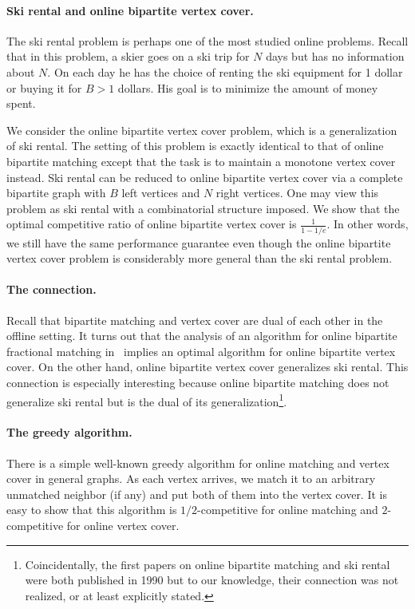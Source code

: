 \documentclass{article}
\begin{document}
\paragraph{Ski rental and online bipartite vertex cover.}
The ski rental problem is perhaps one of the most studied online problems. Recall that in this problem, a skier goes on a ski trip for $N$ days but has no information about $N$. On each day he has the choice of renting the ski equipment for 1 dollar or buying it for $B>1$ dollars. His goal is to minimize the amount of money spent.

We consider the online bipartite vertex cover problem, which is a generalization of ski rental. The setting of this problem is exactly identical to that of online bipartite matching except that the task is to maintain a monotone vertex cover instead. Ski rental can be reduced to online bipartite vertex cover via a complete bipartite graph with $B$ left vertices and $N$ right vertices. One may view this problem as ski rental with a combinatorial structure imposed.
We show that the optimal competitive ratio of online bipartite vertex cover is $\frac{1}{1-1/e}$. In other words, we still have the same performance guarantee even though the online bipartite vertex cover problem is considerably more general than the ski rental problem.

\paragraph{The connection.}
Recall that bipartite matching and vertex cover are dual of each other in the offline setting. It turns out that the analysis of an algorithm for online bipartite fractional matching in~\cite{Buchbinder2007} implies an optimal algorithm for online bipartite vertex cover. On the other hand, online bipartite vertex cover generalizes ski rental. This connection is especially interesting because online bipartite matching does not generalize ski rental but is the dual of its generalization\footnote{Coincidentally, the first papers on online bipartite matching and ski rental were both published in 1990 but to our knowledge, their connection was not realized, or at least explicitly stated.}.

\paragraph{The greedy algorithm.}
There is a simple well-known greedy algorithm for online matching and vertex cover in general graphs. As each vertex arrives, we match it to an arbitrary unmatched neighbor (if any) and put both of them into the vertex cover. It is easy to show that this algorithm is $1/2$-competitive for online matching and $2$-competitive for online vertex cover.
\end{document}
